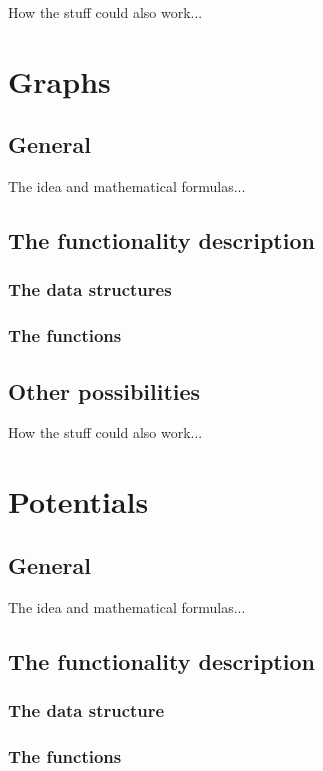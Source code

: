 \documentclass[12pt,a4paper]{report}
\begin{document}
How the stuff could also work...


\newpage
\section{Graphs}
\subsection{General}

The idea and mathematical formulas...


\subsection{The functionality description}
\subsubsection{The data structures}

\subsubsection{The functions}


\subsection{Other possibilities}

How the stuff could also work...


\newpage
\section{Potentials}
\subsection{General}

The idea and mathematical formulas...

\subsection{The functionality description}
\subsubsection{The data structure}

\subsubsection{The functions}
\end{document}
